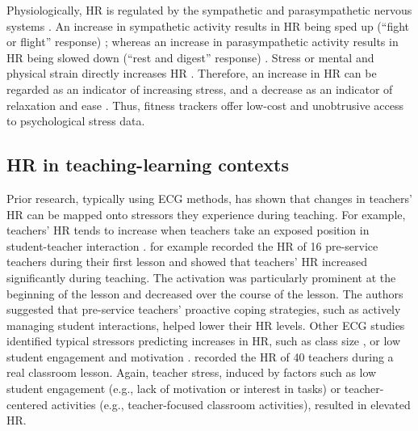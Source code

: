 \documentclass[preprint, 3p,
authoryear]{elsarticle} %
\begin{document}
Physiologically, HR is regulated by the sympathetic and parasympathetic
nervous systems \citep{pham2021}. An increase in sympathetic activity
results in HR being sped up (``fight or flight'' response)
\citep{taelman2009influence}; whereas an increase in parasympathetic
activity results in HR being slowed down (``rest and digest'' response)
\citep{battipaglia2015}. Stress or mental and physical strain directly
increases HR \citep{custodis2014heart, sachs2014}. Therefore, an
increase in HR can be regarded as an indicator of increasing stress, and
a decrease as an indicator of relaxation and ease \citep{kyriacou1978}.
Thus, fitness trackers offer low-cost and unobtrusive access to
psychological stress data.

\subsection{HR in teaching-learning
contexts}\label{hr-in-teaching-learning-contexts}

Prior research, typically using ECG methods, has shown that changes in
teachers' HR can be mapped onto stressors they experience during
teaching. For example, teachers' HR tends to increase when teachers take
an exposed position in student-teacher interaction
\citep{sperka1995, scheuch1997psychophysische, donker2018, junker2021}.
\citet{sperka1995} for example recorded the HR of 16 pre-service
teachers during their first lesson and showed that teachers' HR
increased significantly during teaching. The activation was particularly
prominent at the beginning of the lesson and decreased over the course
of the lesson. The authors suggested that pre-service teachers'
proactive coping strategies, such as actively managing student
interactions, helped lower their HR levels. Other ECG studies identified
typical stressors predicting increases in HR, such as class size
\citep{huang2022class}, or low student engagement and motivation
\citep{junker2021}. \citet{junker2021} recorded the HR of 40 teachers
during a real classroom lesson. Again, teacher stress, induced by
factors such as low student engagement (e.g., lack of motivation or
interest in tasks) or teacher-centered activities (e.g., teacher-focused
classroom activities), resulted in elevated HR.
\end{document}
